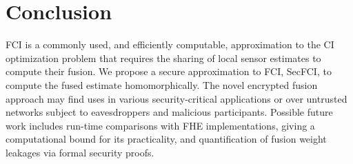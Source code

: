 \documentclass[letterpaper, 10 pt, journal, twoside]{ieeetran}  %
\begin{document}



\section{Conclusion} \label{sec:conclusion}
FCI is a commonly used, and efficiently computable, approximation to the CI optimization problem that requires the sharing of local sensor estimates to compute their fusion. We propose a secure approximation to FCI, SecFCI, to compute the fused estimate homomorphically. The novel encrypted fusion approach may find uses in various security-critical applications or over untrusted networks subject to eavesdroppers and malicious participants. Possible future work includes run-time comparisons with FHE implementations, giving a computational bound for its practicality, and quantification of fusion weight leakages via formal security proofs.



\end{document}
